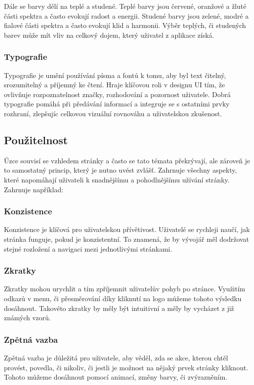 Dále se barvy dělí na teplé a studené. Teplé barvy jsou červené, oranžové a žluté části spektra a často evokují radost a energii. Studené barvy jsou zelené, modré a fialové části spektra a často evokují klid a harmonii. Výběr teplých, či studených barev může mít vliv na celkový dojem, který uživatel z aplikace získá.\cite{color_theory_design} 

\subsubsection{Typografie}
Typografie je umění používání písma a fontů k tomu, aby byl text čitelný, srozumitelný a příjemný ke čtení. Hraje klíčovou roli v designu UI tím, že ovlivňuje rozpoznatelnost značky, rozhodování a pozornost uživatele. Dobrá typografie pomáhá při předávání informací a integruje se s ostatními prvky rozhraní, zlepšujíc celkovou vizuální rovnováhu a uživatelskou zkušenost.\cite{typography}

\subsection{Použitelnost}
Úzce souvisí se vzhledem stránky a často se tato témata překrývají, ale zároveň je to samostatný princip, který je nutno uvést zvlášť. Zahrnuje všechny aspekty, které napomáhají uživateli k snadnějšímu a pohodlnějšímu užívání stránky. Zahrnuje například:\cite{principles_of_ui_design}

\subsubsection*{Konzistence}
Konzistence je klíčová pro uživatelskou přívětivost. Uživatelé se rychleji naučí, jak stránka funguje, pokud je konzistentní. To znamená, že by vývojář měl dodržovat stejné rozložení a navigaci mezi jednotlivými stránkami.

\subsubsection*{Zkratky}
Zkratky mohou urychlit a tím zpříjemnit uživatelův pohyb po stránce. Využitím odkazů v menu, či přesměrování díky kliknutí na logo můžeme tohoto výsledku dosáhnout. Takovéto zkratky by měly být intuitivní a měly by vycházet z již známých vzorů.

\subsubsection*{Zpětná vazba}
Zpětná vazba je důležitá pro uživatele, aby věděl, zda se akce, kterou chtěl provést, povedla, či nikoliv, či jestli je možnost na nějaký prvek stránky kliknout. Tohoto můžeme dosáhnout pomocí animací, změny barvy, či zvýrazněním.


